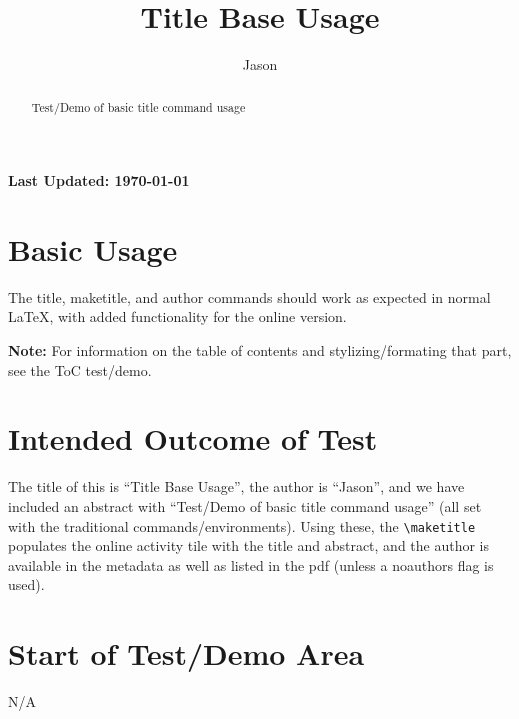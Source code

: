 \documentclass{ximera}
\title{Title Base Usage}
\author{Jason}
\begin{document}
\begin{abstract}
    Test/Demo of basic title command usage
\end{abstract}
\maketitle

{{\Huge \bfseries Last Updated: \today}} \\


\section{Basic Usage}
The title, maketitle, and author commands should work as expected in normal LaTeX, with added functionality for the online version.

\textbf{Note:} For information on the table of contents and stylizing/formating that part, see the ToC test/demo.

\section{Intended Outcome of Test}
The title of this is ``Title Base Usage'', the author is ``Jason'', 
and we have included an abstract with ``Test/Demo of basic title command usage''
(all set with the traditional commands/environments).
Using these, the \verb|\maketitle| populates the online activity tile with the title and abstract, and the author is available in the metadata
as well as listed in the pdf (unless a noauthors flag is used).

\section{Start of Test/Demo Area}
N/A

\hrulefill
\end{document}
